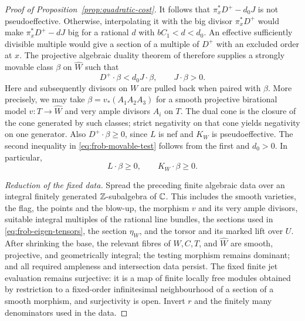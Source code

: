 \begin{proof}[Proof of Proposition~\ref{prop:quadratic-cost}]
It follows that $\pi_x^*D^+-d_0J$ is not pseudoeffective.  Otherwise,
interpolating it with the big divisor $\pi_x^*D^+$ would make
$\pi_x^*D^+-dJ$ big for a rational $d$ with $bC_1<d<d_0$.  An effective
sufficiently divisible multiple would give a section of a multiple of
$D^+$ with an excluded order at $x$.
The projective algebraic duality theorem of
\cite[Theorem~2.2, arXiv version]{BDPP2013} therefore supplies a strongly movable
class $\beta$ on $\widehat W$ such that
\begin{equation}\label{eq:frob-movable-test}
 D^+\cdot\beta<d_0J\cdot\beta,
 \qquad J\cdot\beta>0.
\end{equation}
Here and subsequently divisors on $W$ are pulled back when paired with
$\beta$.  More precisely, we may take
$\beta=v_*(A_1A_2A_3)$ for a smooth projective birational model
$v:T\to\widehat W$ and very ample divisors $A_i$ on $T$.  The dual cone
is the closure of the cone generated by such classes; strict negativity
on that cone yields negativity on one generator.  Also
$D^+\cdot\beta\ge0$, since $L$ is nef and $K_W$ is pseudoeffective.
The second inequality in \eqref{eq:frob-movable-test} follows from the
first and $d_0>0$.  In particular,
\begin{equation}\label{eq:frob-test-nonnegative}
 L\cdot\beta\ge0,\qquad K_W\cdot\beta\ge0.
\end{equation}

\emph{Reduction of the fixed data.}
Spread the preceding finite algebraic data over an integral finitely
generated $\mathbb Z$-subalgebra of $\mathbb C$.  This includes the smooth varieties,
the flag, the points and the blow-up, the morphism $v$ and its very ample
divisors, suitable integral multiples of the rational line bundles,
the sections used in \eqref{eq:frob-eigen-tensors}, the section
$\eta_W$, and the torsor and its marked lift over $U$.  After shrinking
the base, the relevant fibres of $W,C,T$, and $\widehat W$ are smooth,
projective, and geometrically integral; the testing morphism remains
dominant; and all required ampleness and intersection data persist.
The fixed finite jet evaluation remains surjective: it is a map of
finite locally free modules obtained by restriction to a fixed-order
infinitesimal neighbourhood of a section of a smooth morphism, and
surjectivity is open.  Invert $r$ and the finitely many denominators
used in the data.


\end{proof}

